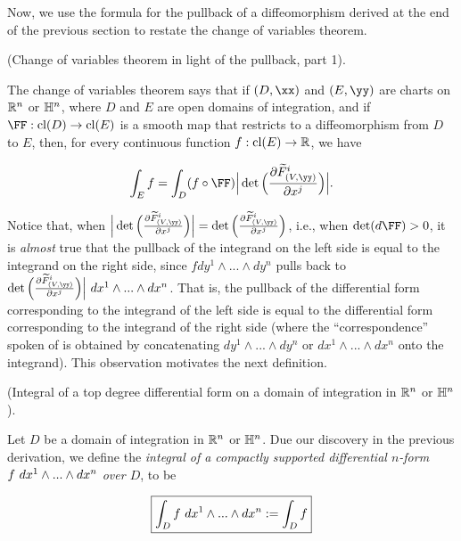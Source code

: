 Now, we use the formula for the pullback of a diffeomorphism derived at the end of the previous section to restate the change of variables theorem.

\begin{deriv}
\label{ch::diff_forms::deriv::change_of_vars_in_light_of_pullback}

     (Change of variables theorem in light of the pullback, part 1).
  
    The change of variables theorem says that if $(D, \xx)$ and $(E, \yy)$ are charts on $\mathbb{R}^n$ or $\mathbb{H}^n$, where $D$ and $E$ are open domains of integration, and if $\FF:\cl(D) \rightarrow \cl(E)$ is a smooth map that restricts to a diffeomorphism from $D$ to $E$, then, for every continuous function $f:\text{cl}(E) \rightarrow \mathbb{R}$, we have
    
    \begin{align*}
        \int_E f = \int_D (f \circ \FF) \Big| \det\Big(\frac{\pd \tF_{(V, \yy)}^i}{\pd x^j} \Big) \Big|.
    \end{align*}

    Notice that, when $\Big| \det\Big(\frac{\pd \tF_{(V, \yy)}^i}{\pd x^j} \Big) \Big| = \det\Big(\frac{\pd \tF_{(V, \yy)}^i}{\pd x^j} \Big)$, i.e., when $\det(d\FF) > 0$, it is \textit{almost} true that the pullback of the integrand on the left side is equal to the integrand on the right side, since $f dy^1 \wedge ... \wedge dy^n$ pulls back to $\det\Big(\frac{\pd \tF_{(V, \yy)}^i}{\pd x^j} \Big) \Big| \spc dx^1 \wedge ... \wedge dx^n$. That is, the pullback of the differential form corresponding to the integrand of the left side is equal to the differential form corresponding to the integrand of the right side (where the ``correspondence'' spoken of is obtained by concatenating $dy^1 \wedge ... \wedge dy^n$ or $dx^1 \wedge ... \wedge dx^n$ onto the integrand). This observation motivates the next definition.
\end{deriv}

\begin{defn}
\label{ch::diff_forms::defn::integral_over_domain_of_integration_Rn_Hn}
     (Integral of a top degree differential form on a domain of integration in $\mathbb{R}^n$ or $\mathbb{H}^n$).
    
    Let $D$ be a domain of integration in $\mathbb{R}^n$ or $\mathbb{H}^n$. Due our discovery in the previous derivation, we define the \textit{integral of a compactly supported differential $n$-form $f \text{ } dx^1 \wedge ... \wedge dx^n$ over $D$}, to be
    
    \begin{align*}
        \boxed
        {
            \int_D f \text{ } dx^1 \wedge ... \wedge dx^n := \int_D f
        }
    \end{align*}
\end{defn}

